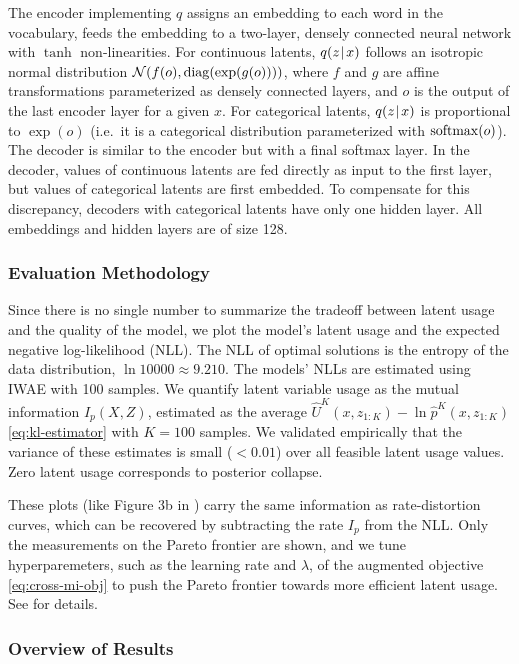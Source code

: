 The encoder implementing $q$ assigns an embedding \citep{mikolov2013distributed} to each word in the vocabulary, feeds the embedding to a two-layer, densely connected neural network with $\tanh$ non-linearities.
For continuous latents, $q(z\hspace{0.08em}|\hspace{0.11em} x)$ follows an isotropic normal distribution $\mathcal{N}(f(o),\operatorname*{diag}(\exp(g(o))))$, where $f$ and $g$ are affine transformations parameterized as densely connected layers, and $o$ is the output of the last encoder layer for a given $x$.
For categorical latents, $q(z\hspace{0.08em}|\hspace{0.11em} x)$ is proportional to $\exp(o)$ (i.e.\ it is a categorical distribution parameterized with $\operatorname*{softmax}(o)$).
The decoder is similar to the encoder but with a final softmax layer.
In the decoder, values of continuous latents are fed directly as input to the first layer, but values of categorical latents are first embedded.
To compensate for this discrepancy, decoders with categorical latents have only one hidden layer.
All embeddings and hidden layers are of size 128.

\subsubsection{Evaluation Methodology}

Since there is no single number to summarize the tradeoff between latent usage and the quality of the model, we plot the model's latent usage and the expected negative log-likelihood (NLL).
The NLL of optimal solutions is the entropy of the data distribution, $\ln 10000\approx 9.210$.
The models' NLLs are estimated using IWAE with 100 samples.
We quantify latent variable usage as the mutual information $I_p(X,Z)$, estimated as the average $\hat{U}^K(x, z_{1:K}) - \ln \hat{p}^K(x, z_{1:K})$ \eqref{eq:kl-estimator} with $K=100$ samples.
We validated empirically that the variance of these estimates is small ($<0.01$) over all feasible latent usage values.
Zero latent usage corresponds to posterior collapse.

These plots (like Figure 3b in \citealt{alemi2017fixing}) carry the same information as rate-distortion curves, which can be recovered by subtracting the rate $I_p$ from the NLL.
Only the measurements on the Pareto frontier are shown, and we tune hyperparemeters, such as the learning rate and $\lambda$, of the augmented objective \eqref{eq:cross-mi-obj} to push the Pareto frontier towards more efficient latent usage.
See  for details.

\subsubsection{Overview of Results}

